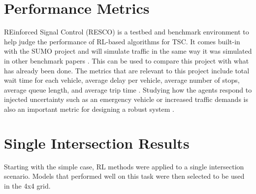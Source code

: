 \documentclass[letterpaper]{article} %
\begin{document}
\section{Performance Metrics}
REinforced Signal Control (RESCO) is a testbed and benchmark environment to help judge the performance of RL-based algorithms for TSC. It comes built-in with the SUMO project and will simulate traffic in the same way it was simulated in other benchmark papers \cite{ault2021reinforcement}. This can be used to compare this project with what has already been done.
The metrics that are relevant to this project include total wait time for each vehicle, average delay per vehicle, average number of stops, average queue length, and average trip time \cite{Reza2023}.
Studying how the agents respond to injected uncertainty such as an emergency vehicle or increased traffic demands is also an important metric for designing a robust system \cite{DBLP:journals/corr/abs-2004-04778}.




\section{Single Intersection Results}
Starting with the simple case, RL methods were applied to a single intersection scenario.
Models that performed well on this task were then selected to be used in the 4x4 grid.
\end{document}
